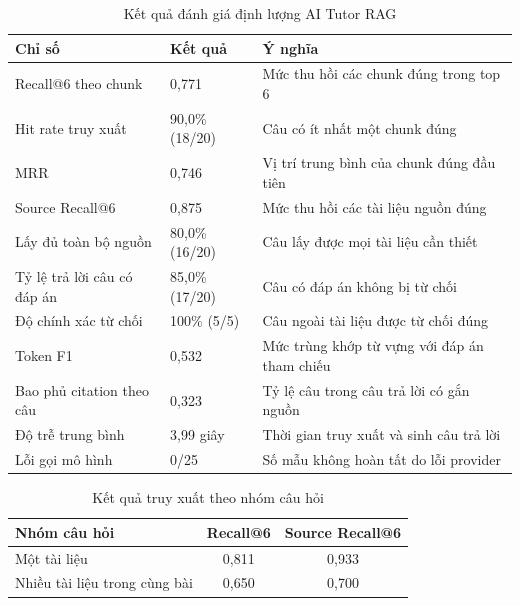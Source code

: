 \documentclass[../DoAn.tex]{subfiles}
\begin{document}
\begin{table}[H]
\centering
\caption{Kết quả đánh giá định lượng AI Tutor RAG}
\label{tab:rag_quantitative_results}
\small
\renewcommand{\arraystretch}{1.3}
\setlength{\tabcolsep}{5pt}
\begin{tabular}{|p{5.8cm}|p{2.2cm}|p{4.2cm}|}
\hline
\textbf{Chỉ số} & \textbf{Kết quả} & \textbf{Ý nghĩa} \\ \hline
Recall@6 theo chunk & 0,771 & Mức thu hồi các chunk đúng trong top 6 \\ \hline
Hit rate truy xuất & 90,0\% (18/20) & Câu có ít nhất một chunk đúng \\ \hline
MRR & 0,746 & Vị trí trung bình của chunk đúng đầu tiên \\ \hline
Source Recall@6 & 0,875 & Mức thu hồi các tài liệu nguồn đúng \\ \hline
Lấy đủ toàn bộ nguồn & 80,0\% (16/20) & Câu lấy được mọi tài liệu cần thiết \\ \hline
Tỷ lệ trả lời câu có đáp án & 85,0\% (17/20) & Câu có đáp án không bị từ chối \\ \hline
Độ chính xác từ chối & 100\% (5/5) & Câu ngoài tài liệu được từ chối đúng \\ \hline
Token F1 & 0,532 & Mức trùng khớp từ vựng với đáp án tham chiếu \\ \hline
Bao phủ citation theo câu & 0,323 & Tỷ lệ câu trong câu trả lời có gắn nguồn \\ \hline
Độ trễ trung bình & 3,99 giây & Thời gian truy xuất và sinh câu trả lời \\ \hline
Lỗi gọi mô hình & 0/25 & Số mẫu không hoàn tất do lỗi provider \\ \hline
\end{tabular}
\end{table}

\begin{table}[H]
\centering
\caption{Kết quả truy xuất theo nhóm câu hỏi}
\label{tab:rag_results_by_category}
\small
\renewcommand{\arraystretch}{1.3}
\setlength{\tabcolsep}{6pt}
\begin{tabular}{|p{6.2cm}|c|c|}
\hline
\textbf{Nhóm câu hỏi} & \textbf{Recall@6} & \textbf{Source Recall@6} \\ \hline
Một tài liệu & 0,811 & 0,933 \\ \hline
Nhiều tài liệu trong cùng bài & 0,650 & 0,700 \\ \hline
\end{tabular}
\end{table}
\end{document}
